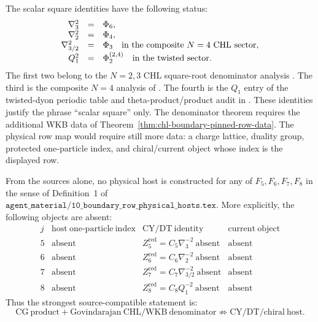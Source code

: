 \begin{remark}
\label{rem:chl-boundary-scalar-square-audit}
The scalar square identities have the following status:
\[
\begin{array}{rcl}
\nabla_3^2&=&\Phi_6,\\
\nabla_2^2&=&\Phi_4,\\
\nabla_{3/2}^2&=&\Phi_3
  \quad\hbox{in the composite \(N=4\) CHL sector},\\
Q_1^2&=&\Phi_2^{(2,4)}
  \quad\hbox{in the twisted sector}.
\end{array}
\]
The first two belong to the \(N=2,3\) CHL square-root denominator analysis
\cite{GK09CHL,CD09BKM}.  The third is the composite \(N=4\) analysis of
\cite{GK10Composite}.  The fourth is the \(Q_1\) entry of the twisted-dyon
periodic table and theta-product/product audit in \cite{Gov11BKM}.  These
identities justify the phrase ``scalar square'' only.  The denominator theorem
requires the additional WKB data of Theorem~\ref{thm:chl-boundary-pinned-row-data}.
The physical row map would require still more data: a charge lattice, duality
group, protected one-particle index, and chiral/current object whose index is
the displayed row.
\end{remark}

\begin{proposition}
\label{prop:chl-boundary-physical-host-nogo}
From the sources \cite{GC,CD09BKM,GK09CHL,GK10Composite,Gov11BKM} alone,
no physical host is constructed for any of \(F_5,F_6,F_7,F_8\) in the sense
of Definition~1 of \(\texttt{agent\_material/10\_boundary\_row\_physical\_hosts.tex}\).
More explicitly, the following objects are absent:
\[
\begin{array}{c|c|c|c}
j&\mathrm{host\ one\mbox{-}particle\ index}&
\mathrm{CY/DT\ identity}&\mathrm{current\ object}\\ \hline
5&\mathrm{absent}&Z_5^{\mathrm{red}}=C_5\nabla_3^{-2}\ \mathrm{absent}&
\mathrm{absent}\\
6&\mathrm{absent}&Z_6^{\mathrm{red}}=C_6\nabla_2^{-2}\ \mathrm{absent}&
\mathrm{absent}\\
7&\mathrm{absent}&Z_7^{\mathrm{red}}=C_7\nabla_{3/2}^{-2}\ \mathrm{absent}&
\mathrm{absent}\\
8&\mathrm{absent}&Z_8^{\mathrm{red}}=C_8Q_1^{-2}\ \mathrm{absent}&
\mathrm{absent}
\end{array}
\]
Thus the strongest source-compatible statement is:
\[
\boxed{\mathrm{CG\ product}+\mathrm{Govindarajan\ CHL/WKB\ denominator}
\not\Rightarrow \mathrm{CY/DT/chiral\ host}.}
\]
\end{proposition}

